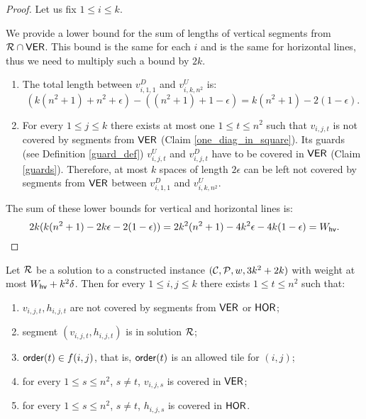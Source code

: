 \begin{proof}
Let us fix $1 \le i \le k$.

We provide a lower bound for the sum of lengths
of vertical segments from $\mathcal{R} \cap \mathsf{VER}$.
This bound is the same for each $i$ and is the same
for horizontal lines, thus we need to multiply such a bound by $2k$.

\begin{enumerate}[label={(\arabic*)}]
\item The total length between $v^D_{i, 1, 1}$ and $v^U_{i, k, n^2}$ is:
$$(k(n^2+1) + n^2 +\epsilon) - ((n^2+1)+1 -\epsilon) = k(n^2+1) - 2(1 - \epsilon).$$

\item For every $1 \le j \le k$ there exists at most one $1 \le t \le n^2$
such that $v_{i,j,t}$ is not covered by segments from $\mathsf{VER}$
(Claim \ref{one_diag_in_square}).
Its guards (see Definition \ref{guard_def}) $v^U_{i,j,t}$ and $v^D_{i,j,t}$
have to be covered in $\mathsf{VER}$ (Claim \ref{guards}).
Therefore, at most $k$ spaces of length $2\epsilon$ can be left
not covered by segments from $\mathsf{VER}$ between $v_{i,1,1}^D$ and $v_{i,k,n^2}^U$.

\end{enumerate}
The sum of these lower bounds for vertical and horizontal lines is:
$$2k(k(n^2+1) -2k\epsilon -2(1-\epsilon)) = 2k^2(n^2+1) -4k^2\epsilon -4k(1-\epsilon) = W_{\mathsf{hv}}.\qedhere$$
\end{proof}

\begin{lemma}
\label{diag_correct}
Let $\mathcal{R}$ be a solution to a constructed instance $(\mathcal{C}, \mathcal{P}, w, 3k^2+2k)$
with weight at most  $W_{\mathsf{hv}}+k^2\delta$.
Then for every $1 \le i,j \le k$
there exists $1 \le t \le n^2$ such that:
\begin{enumerate}[label={(\arabic*)}]
\item $v_{i,j,t}, h_{i,j,t}$ are not covered by segments from $\mathsf{VER}$ or $\mathsf{HOR}$;
\item segment $(v_{i,j,t}, h_{i,j,t})$ is in solution $\mathcal{R}$;
\item $\mathsf{order}(t) \in f(i,j)$, that is, $\mathsf{order}(t)$ is an allowed tile for $(i,j)$;
\item for every $1 \le s\le n^2$, $s \neq t$, $v_{i,j,s}$ is covered in $\mathsf{VER}$;
\item for every $1 \le s\le n^2$, $s \neq t$, $h_{i,j,s}$ is covered in $\mathsf{HOR}$.
\end{enumerate}
\end{lemma}

